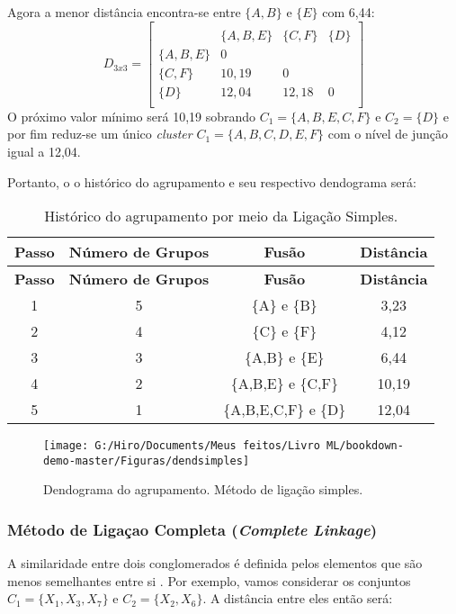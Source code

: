 \documentclass[
]{book}
\begin{document}
Agora a menor distância encontra-se entre \(\{A,B\}\) e \(\{E\}\) com 6,44:
\[D_{3x3}=\begin{bmatrix}\\
 &\{A,B,E\}& \{C,F\}&\{D\} \\
 \{A,B,E\}&0&\\
 \{C,F\} & 10,19&0&\\
 \{D\}& 12,04& 12,18&0\\
\end{bmatrix}\]
O próximo valor mínimo será 10,19 sobrando \(C_1=\{A,B,E,C,F\}\) e \(C_2=\{D\}\) e por fim reduz-se um único \emph{cluster} \(C_1=\{A,B,C,D,E,F\}\) com o nível de junção igual a 12,04.

Portanto, o o histórico do agrupamento e seu respectivo dendograma será:

\begin{longtable}[]{@{}cccc@{}}
\caption{\label{tab:ligsimple} Histórico do agrupamento por meio da Ligação Simples.}\tabularnewline
\toprule
\textbf{Passo} & \textbf{Número de Grupos} & \textbf{Fusão} & \textbf{Distância}\tabularnewline
\midrule
\endfirsthead
\toprule
\textbf{Passo} & \textbf{Número de Grupos} & \textbf{Fusão} & \textbf{Distância}\tabularnewline
\midrule
\endhead
1 & 5 & \{A\} e \{B\} & 3,23\tabularnewline
2 & 4 & \{C\} e \{F\} & 4,12\tabularnewline
3 & 3 & \{A,B\} e \{E\} & 6,44\tabularnewline
4 & 2 & \{A,B,E\} e \{C,F\} & 10,19\tabularnewline
5 & 1 & \{A,B,E,C,F\} e \{D\} & 12,04\tabularnewline
\bottomrule
\end{longtable}

\begin{figure}

{\centering \texttt{[image: G:/Hiro/Documents/Meus feitos/Livro ML/bookdown-demo-master/Figuras/dendsimples]} 

}

\caption{Dendograma do agrupamento. Método de ligação simples.}\label{fig:dendsimples}
\end{figure}



\hypertarget{muxe9todo-de-ligauxe7ao-completa-complete-linkage}{%
\subsubsection{\texorpdfstring{Método de Ligaçao Completa (\emph{Complete Linkage})}{Método de Ligaçao Completa (Complete Linkage)}}\label{muxe9todo-de-ligauxe7ao-completa-complete-linkage}}

A similaridade entre dois conglomerados é definida pelos elementos que são menos semelhantes entre si \citep{sneath1957application}. Por exemplo, vamos considerar os conjuntos \(C_1=\{X_1,X_3,X_7\}\) e \(C_2=\{X_2,X_6\}\). A distância entre eles então será:
\end{document}
